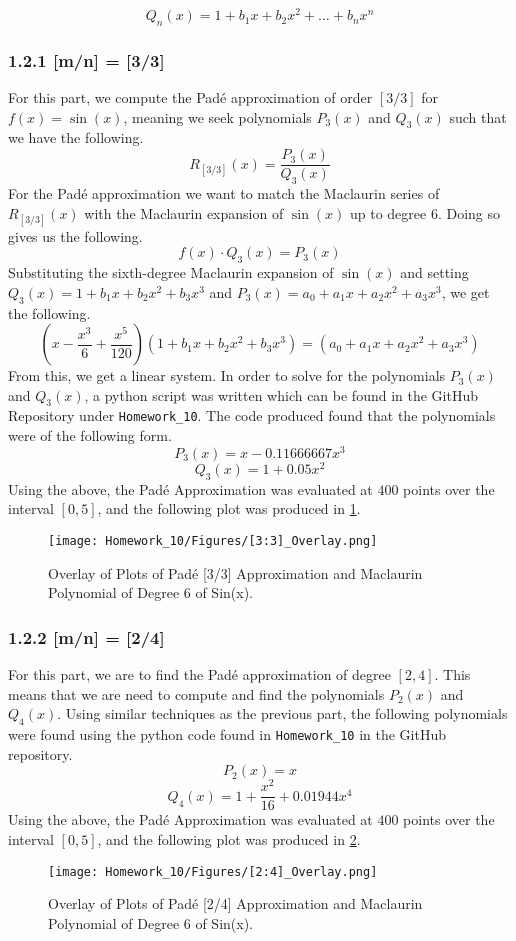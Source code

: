 \documentclass{article}
\begin{document}
\begin{equation}
    \label{Eqn_3}
    Q_n(x) = 1 + b_1x + b_2x^2 + \dots + b_nx^n
\end{equation}

\subsubsection*{1.2.1 [m/n] = [3/3]}
For this part, we compute the Padé approximation of order $[3/3]$ for $f(x) = \sin(x)$, meaning we seek polynomials $P_3(x)$ and $Q_3(x)$ such that we have the following.
\[
R_{[3/3]}(x) = \frac{P_3(x)}{Q_3(x)}
\]
For the Padé approximation we want to match the Maclaurin series of $R_{[3/3]}(x)$ with the Maclaurin expansion of $\sin(x)$ up to degree 6. Doing so gives us the following.
\[
f(x) \cdot Q_3(x) = P_3(x)
\]
Substituting the sixth-degree Maclaurin expansion of $\sin(x)$ and setting \(Q_3(x) = 1 + b_1 x + b_2 x^2 + b_3 x^3\) and \(P_3(x) = a_0 + a_1 x + a_2 x^2 + a_3 x^3\), we get the following.
\[
\left(x - \frac{x^3}{6} + \frac{x^5}{120}\right)(1 + b_1 x + b_2 x^2 + b_3 x^3)=(a_0 + a_1 x + a_2 x^2 + a_3 x^3)
\]
From this, we get a linear system. In order to solve for the polynomials \(P_3(x)\) and \(Q_3(x)\), a python script was written which can be found in the GitHub Repository under \texttt{Homework\_10}. The code produced found that the polynomials were of the following form.
\[
P_3(x) = x - 0.11666667x^3
\]
\[
Q_3(x) = 1 + 0.05x^2
\]
Using the above, the Pad\'e Approximation was evaluated at \(400\) points over the interval \([0,5]\), and the following plot was produced in \ref{fig:[3/3]_Overlay}.
\begin{figure}[h!]
    \centering
    \texttt{[image: Homework\_10/Figures/[3:3]\_Overlay.png]}
    \caption{Overlay of Plots of Pad\'e [3/3] Approximation and Maclaurin Polynomial of Degree 6 of Sin(x).}
    \label{fig:[3/3]_Overlay}
\end{figure}

\subsubsection*{1.2.2 [m/n] = [2/4]}
For this part, we are to find the Pad\'e approximation of degree \([2,4]\). This means that we are need to compute and find the polynomials \(P_2(x)\) and \(Q_4(x)\). Using similar techniques as the previous part, the following polynomials were found using the python code found in \texttt{Homework\_10} in the GitHub repository.
\[
P_2(x) = x
\]
\[
Q_4(x) = 1 + \frac{x^2}{16} + 0.01944x^4
\]
Using the above, the Pad\'e Approximation was evaluated at \(400\) points over the interval \([0,5]\), and the following plot was produced in \ref{fig:[2/4]_Overlay}.
\begin{figure}[h!]
    \centering
    \texttt{[image: Homework\_10/Figures/[2:4]\_Overlay.png]}
    \caption{Overlay of Plots of Pad\'e [2/4] Approximation and Maclaurin Polynomial of Degree 6 of Sin(x).}
    \label{fig:[2/4]_Overlay}
\end{figure}
\end{document}
